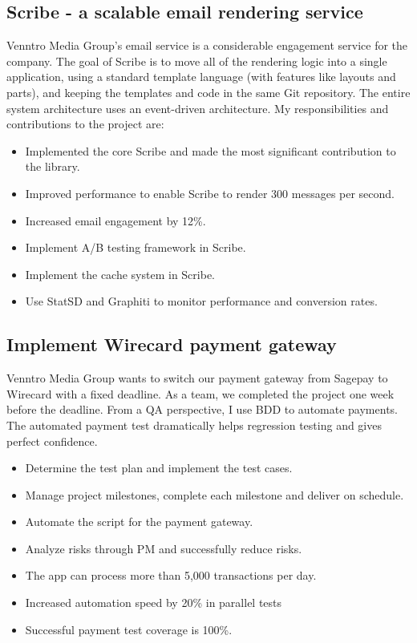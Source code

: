 \documentclass[a4paper]{twentysecondcv-english} %
\begin{document}
\newpage %
\makesidebar

\subsection{Scribe - a scalable email rendering service}

Venntro Media Group's email service is a considerable engagement service for the company. The goal of Scribe is to move all of the rendering logic into a single application, using a standard template language (with features like layouts and parts), and keeping the templates and code in the same Git repository. The entire system architecture uses an event-driven architecture. My responsibilities and contributions to the project are:
\begin{itemize}
    \item Implemented the core Scribe and made the most significant contribution to the library.
    \item Improved performance to enable Scribe to render 300 messages per second.
    \item Increased email engagement by 12\%.
    \item Implement A/B testing framework in Scribe.
    \item Implement the cache system in Scribe.
    \item Use StatSD and Graphiti to monitor performance and conversion rates.
\end{itemize}

\subsection{Implement Wirecard payment gateway}

Venntro Media Group wants to switch our payment gateway from Sagepay to Wirecard with a fixed deadline. As a team, we completed the project one week before the deadline. From a QA perspective, I use BDD to automate payments. The automated payment test dramatically helps regression testing and gives perfect confidence.
\begin{itemize}
    \item Determine the test plan and implement the test cases.
    \item Manage project milestones, complete each milestone and deliver on schedule.
    \item Automate the script for the payment gateway.
    \item Analyze risks through PM and successfully reduce risks.
    \item The app can process more than 5,000 transactions per day.
    \item Increased automation speed by 20\% in parallel tests
    \item Successful payment test coverage is 100\%.
\end{itemize}
\end{document}

